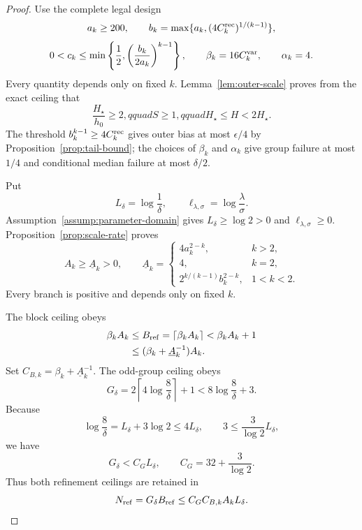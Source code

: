 \begin{proof}
Use the complete legal design
\[
 a_k\geq200,
 \qquad b_k=\max\{a_k,(4C_k^{\rm rec})^{1/(k-1)}\},
\]
\[
 0<c_k\leq\min\left\{\frac12,
 \left(\frac{b_k}{2a_k}\right)^{k-1}\right\},
 \qquad \beta_k=16C_k^{\rm var},
 \qquad \alpha_k=4.
\]
Every quantity depends only on fixed $k$.  Lemma~\ref{lem:outer-scale}
proves from the exact ceiling that
\[
 \frac{H_\star}{h_0}\geq2,qquad S\geq1,qquad
 H_\star\leq H<2H_\star.
\]
The threshold $b_k^{k-1}\geq4C_k^{\rm rec}$ gives outer bias at most
$\epsilon/4$ by Proposition~\ref{prop:tail-bound}; the choices of
$\beta_k$ and $\alpha_k$ give group failure at most $1/4$ and conditional
median failure at most $\delta/2$.

Put
\[
 L_\delta=\log\frac1\delta,
 \qquad \ell_{\lambda,\sigma}=\log\frac\lambda\sigma.
\]
Assumption~\ref{assump:parameter-domain} gives
$L_\delta\geq\log2>0$ and $\ell_{\lambda,\sigma}\geq0$.
Proposition~\ref{prop:scale-rate} proves
\[
 A_k\geq\underline A_k>0,
 \qquad
 \underline A_k=
 \begin{cases}
 4a_k^{2-k},&k>2,\\
 4,&k=2,\\
 2^{k/(k-1)}b_k^{2-k},&1<k<2.
 \end{cases}
\]
Every branch is positive and depends only on fixed $k$.

The block ceiling obeys
\[
\begin{aligned}
 \beta_kA_k
 &\leq B_{\rm ref}=\lceil\beta_kA_k\rceil
 <\beta_kA_k+1\\
 &\leq(\beta_k+\underline A_k^{-1})A_k.
\end{aligned}
\]
Set $C_{B,k}=\beta_k+\underline A_k^{-1}$.  The odd-group ceiling obeys
\[
 G_\delta=2\left\lceil4\log\frac8\delta\right\rceil+1
 <8\log\frac8\delta+3.
\]
Because
\[
 \log\frac8\delta=L_\delta+3\log2\leq4L_\delta,
 \qquad 3\leq\frac3{\log2}L_\delta,
\]
we have
\[
 G_\delta<C_GL_\delta,
 \qquad C_G=32+\frac3{\log2}.
\]
Thus both refinement ceilings are retained in
\[
 N_{\rm ref}=G_\delta B_{\rm ref}
 \leq C_GC_{B,k}A_kL_\delta.
\]


\end{proof}
